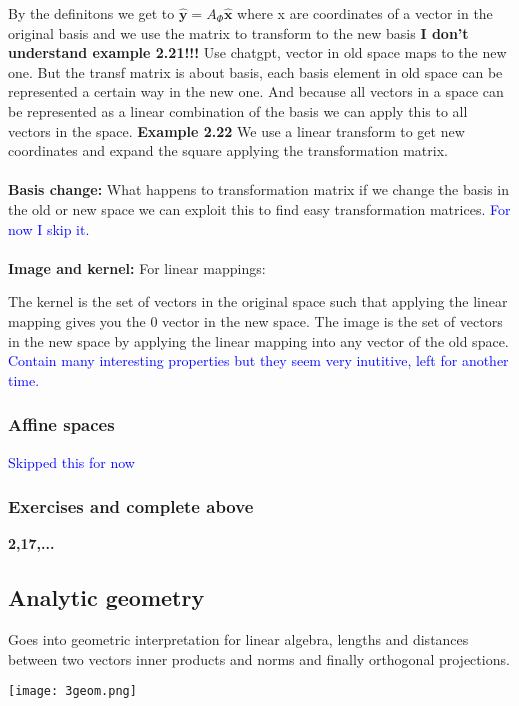 \documentclass{article}
\newcommand{\tblue}[1]{\textcolor{blue}{#1}}
\begin{document}
By the definitons we get to $\hat{\textbf{y}} = A_{\Phi}\hat{\textbf{x}}$ where x are coordinates of a vector in the original basis 
and we use the matrix to transform to the new basis 
\textbf{I don't understand example 2.21!!!} Use chatgpt, vector in old space maps to the new one. But the transf matrix is about
basis, each basis element in old space can be represented a certain way in the new one. And because all vectors in a space can
be represented as a linear combination of the basis we can apply this to all vectors in the space.
\textbf{Example 2.22} We use a linear transform to get new coordinates and expand the square applying the transformation matrix.
\\
\\
\textbf{Basis change:}
What happens to transformation matrix if we change the basis in the old or new space 
we can exploit this to find easy transformation matrices. \tblue{For now I skip it.}
\\
\\
\textbf{Image and kernel:}
For linear mappings:

The kernel is the set of vectors in the original space such that applying the linear mapping gives you the 0 vector in the new space.
The image is the set of vectors in the new space by applying the linear mapping into any vector of the old space.
\tblue{Contain many interesting properties but they seem very inutitive, left for another time.}

\subsubsection{Affine spaces}
\tblue{Skipped this for now}


\subsubsection{Exercises and complete above}

\textbf{2,17,...}

\subsection{Analytic geometry}
Goes into geometric interpretation for linear algebra, lengths and distances between two vectors
inner products and norms and finally orthogonal projections.

\begin{center}
    \texttt{[image: 3geom.png]} %
\end{center}
\end{document}

